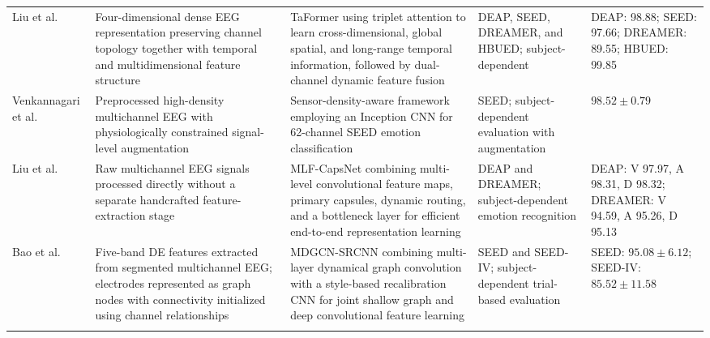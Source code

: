 \documentclass{WileyMSP-template}
\newcommand{\lightrowsep}{%
    \arrayrulecolor{lightrowgray}%
    \specialrule{0.30pt}{3.5pt}{3.5pt}%
    \arrayrulecolor{black}%
}
\begin{document}
\begin{table}
\begin{tabularx}{\textheight}{
>{\raggedright\arraybackslash}p{3.15cm}
>{\raggedright\arraybackslash}X
>{\raggedright\arraybackslash}X
>{\raggedright\arraybackslash}p{3.65cm}
>{\raggedright\arraybackslash}p{5.15cm}}
\lightrowsep

Liu et al. \cite{liu2026taformer} &
Four-dimensional dense EEG representation preserving channel topology
together with temporal and multidimensional feature structure &
TaFormer using triplet attention to learn cross-dimensional,
global spatial, and long-range temporal information,
followed by dual-channel dynamic feature fusion &
DEAP, SEED, DREAMER, and HBUED; subject-dependent &
DEAP: 98.88;
SEED: 97.66;
DREAMER: 89.55;
HBUED: 99.85 \\

\lightrowsep

Venkannagari et al. \cite{venkannagari2026robusteeg} &
Preprocessed high-density multichannel EEG with physiologically constrained
signal-level augmentation &
Sensor-density-aware framework employing an Inception CNN
for 62-channel SEED emotion classification &
SEED; subject-dependent evaluation with augmentation &
$98.52 \pm 0.79$ \\

\lightrowsep

Liu et al. \cite{liu2020mlfcapsnet} &
Raw multichannel EEG signals processed directly without a separate
handcrafted feature-extraction stage &
MLF-CapsNet combining multi-level convolutional feature maps,
primary capsules, dynamic routing, and a bottleneck layer
for efficient end-to-end representation learning &
DEAP and DREAMER; subject-dependent emotion recognition &
DEAP: V 97.97, A 98.31, D 98.32;
DREAMER: V 94.59, A 95.26, D 95.13 \\

\lightrowsep

Bao et al. \cite{bao2022mdgcnsrcnn} &
Five-band DE features extracted from segmented multichannel EEG;
electrodes represented as graph nodes with connectivity initialized
using channel relationships &
MDGCN-SRCNN combining multi-layer dynamical graph convolution with
a style-based recalibration CNN for joint shallow graph
and deep convolutional feature learning &
SEED and SEED-IV; subject-dependent trial-based evaluation &
SEED: $95.08 \pm 6.12$;
SEED-IV: $85.52 \pm 11.58$ \\

\midrule
\multicolumn{5}{r}{\textit{Continued on next page}} \\

\bottomrule

\end{tabularx}

\end{table}
\end{document}
